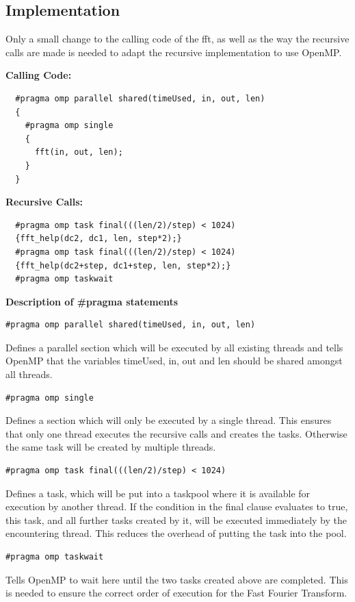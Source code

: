 \subsection{Implementation}

Only a small change to the calling code of the fft, as well as the way the recursive calls are made is needed to adapt the recursive implementation to use OpenMP.

\textbf{Calling Code:}
\begin{lstlisting}
  #pragma omp parallel shared(timeUsed, in, out, len)
  {
    #pragma omp single
    {
      fft(in, out, len);
    }
  }
\end{lstlisting}

\textbf{Recursive Calls:}
\begin{lstlisting}
  #pragma omp task final(((len/2)/step) < 1024)
  {fft_help(dc2, dc1, len, step*2);}
  #pragma omp task final(((len/2)/step) < 1024)
  {fft_help(dc2+step, dc1+step, len, step*2);}
  #pragma omp taskwait
\end{lstlisting}

\textbf{Description of \#pragma statements}
\begin{lstlisting}
#pragma omp parallel shared(timeUsed, in, out, len)
\end{lstlisting}
Defines a parallel section which will be executed by all existing threads and tells OpenMP that the variables timeUsed, in, out and len should be shared amongst all threads.

\begin{lstlisting}
#pragma omp single
\end{lstlisting}
Defines a section which will only be executed by a single thread. This ensures that only one thread executes the recursive calls and creates the tasks. Otherwise the same task will be created by multiple threads.

\begin{lstlisting}
#pragma omp task final(((len/2)/step) < 1024)
\end{lstlisting}
Defines a task, which will be put into a taskpool where it is available for execution by another thread. If the condition in the final clause evaluates to true,
this task, and all further tasks created by it, will be executed immediately by the encountering thread. This reduces the overhead of putting the task into the pool.

\pagebreak
\begin{lstlisting}
#pragma omp taskwait
\end{lstlisting}
Tells OpenMP to wait here until the two tasks created above are completed. This is needed to ensure the correct order of execution for the Fast Fourier Transform.


